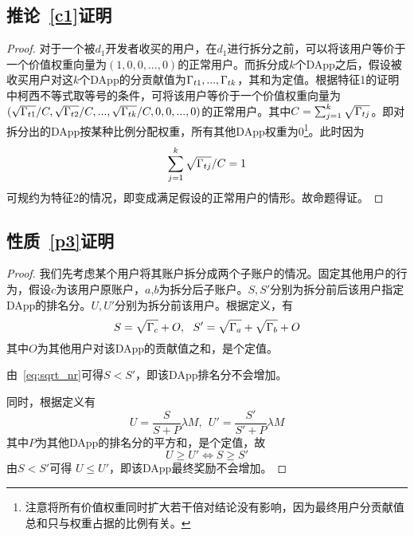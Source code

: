\subsection{推论~\ref{c1}证明}
\label{subsection:proof3}
\begin{proof}
	对于一个被$d_1$开发者收买的用户，在$d_1$进行拆分之前，可以将该用户等价于一个价值权重向量为$(1,0,0,...,0)$的正常用户。而拆分成$k$个DApp之后，假设被收买用户对这$k$个DApp的分贡献值为$\Gamma_{t1},...,\Gamma_{tk}$，其和为定值。根据特征1的证明中柯西不等式取等号的条件，可将该用户等价于一个价值权重向量为$(\sqrt{\Gamma_{t1}}/C,\sqrt{\Gamma_{t2}}/C,...,\sqrt{\Gamma_{tk}}/C,0,0,...,0)$的正常用户。其中$C=\sum_{j=1}^k \sqrt{\Gamma_{tj}}$。即对拆分出的DApp按某种比例分配权重，所有其他DApp权重为0\footnote{注意将所有价值权重同时扩大若干倍对结论没有影响，因为最终用户分贡献值总和只与权重占据的比例有关。}。此时因为
	$$\sum_{j=1}^k \sqrt{\Gamma_{tj}}/C =1$$
	可规约为特征2的情况，即变成满足假设的正常用户的情形。故命题得证。
\end{proof}

\subsection{性质~\ref{p3}证明}
\begin{proof}
我们先考虑某个用户将其账户拆分成两个子账户的情况。固定其他用户的行为，假设$c$为该用户原账户，$a$,$b$为拆分后子账户。$S,S'$分别为拆分前后该用户指定DApp的排名分。$U,U'$分别为拆分前该用户。根据定义，有
$$S= \sqrt{\Gamma_c}+O,~~S'=\sqrt{\Gamma_a}+\sqrt{\Gamma_b}+O$$
其中$O$为其他用户对该DApp的贡献值之和，是个定值。

由~\ref{eq:sqrt_nr}可得$S < S'$，即该DApp排名分不会增加。

同时，根据定义有
$$U = \frac{S}{S+P}\lambda M,~~U' = \frac{S'}{S'+P} \lambda M$$
其中$P$为其他DApp的排名分的平方和，是个定值，故
$$U \geq U' \Leftrightarrow S \geq S'$$
由$S < S' $可得 $U \leq U'$，即该DApp最终奖励不会增加。
\end{proof}